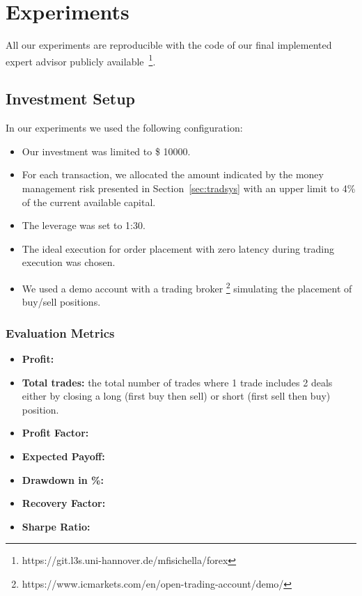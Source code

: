 \section{Experiments}
All our experiments are reproducible with the code of our final implemented expert advisor publicly available~\footnote{https://git.l3s.uni-hannover.de/mfisichella/forex}.

\subsection{Investment Setup}
\noindent In our experiments we used the following configuration:

\begin{itemize}
\setlength\itemsep{0.3em}
\item Our investment was limited to \$ 10000.
\item For each transaction, we allocated the amount indicated by the money management risk presented in Section~\ref{sec:tradsys} with an upper limit to 4\% of the current available capital.
\item The leverage was set to 1:30. 
\item The ideal execution for order placement with zero latency during trading execution was chosen.
\item We used a demo account with a trading broker \footnote{https://www.icmarkets.com/en/open-trading-account/demo/} simulating the placement of buy/sell positions.
\end{itemize}

\subsubsection{Evaluation Metrics}

\begin{itemize}
\setlength\itemsep{0.3em}
\item \textbf{Profit:}
\item \textbf{Total trades:} the total number of trades where 1 trade includes 2 deals either by closing a long (first buy then sell) or short (first sell then buy) position.
\item \textbf{Profit Factor:}
\item \textbf{Expected Payoff:}
\item \textbf{Drawdown in \%:}
\item \textbf{Recovery Factor:}
\item \textbf{Sharpe Ratio:}
\end{itemize}





